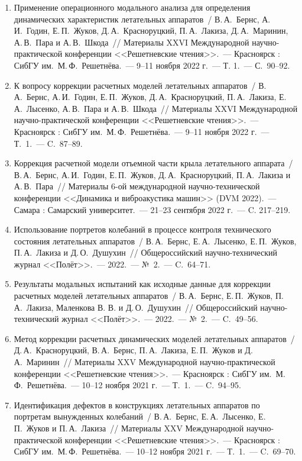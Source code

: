 \begin{enumerate}
	\item Применение операционного модального анализа для определения динамических характеристик летательных аппаратов~/ В.\,А.~Бернс, А.\,И.~Годин, Е.\,П.~Жуков, Д.\,А.~Красноруцкий, П.\,А.~Лакиза, Д.\,А.~Маринин, А.\,В.~Пара и А.\,В.~Шкода~// Материалы XXVI Международной научно-практической конференции <<Решетневские чтения>>.~--- Красноярск : СибГУ им.~М.\,Ф.~Решетнёва.~--- 9--11 ноября 2022 г.~--- Т. 1.~--- С.~90--92.
	\item К вопросу коррекции расчетных моделей летательных аппаратов~/ В.\,А.~Бернс, А.\,И.~Годин, Е.\,П.~Жуков, Д.\,А.~Красноруцкий, П.\,А.~Лакиза, Е.\,А.~Лысенко, А.\,В.~Пара и А.\,В.~Шкода~// Материалы XXVI Международной научно-практической конференции <<Решетневские чтения>>.~--- Красноярск : СибГУ им.~М.\,Ф.~Решетнёва.~--- 9--11 ноября 2022 г.~--- Т.~1.~--- C.~87--89.
	\item Коррекция расчетной модели отъемной части крыла летательного аппарата~/ В.\,А.~Бернс, А.\,И.~Годин, Е.\,П.~Жуков, Д.\,А.~Красноруцкий, П.\,А.~Лакиза и А.\,В.~Пара~// Материалы 6-ой международной научно-технической конференции <<Динамика и виброакустика машин>> (DVM 2022).~--- Самара : Самарский университет.~--- 21--23 сентября 2022 г.~--- C. 217--219.
	\item Использование портретов колебаний в процессе контроля технического состояния летательных аппаратов~/ В.\,А.~Бернс, Е.\,А.~Лысенко, Е.\,П.~Жуков, П.\,А.~Лакиза и Д.\,О.~Душухин~// Общероссийский научно-технический журнал <<Полёт>>.~--- 2022.~--- №~2.~--- C.~64--71.
	\item Результаты модальных испытаний как исходные данные для коррекции расчетных моделей летательных аппаратов~/ В.\,А.~Бернс, Е.\,П.~Жуков, П.\,А.~Лакиза, Маленкова В. В. и Д.\,О.~Душухин~// Общероссийский научно-технический журнал <<Полёт>>.~--- 2022.~--- №~2.~--- C.~49--56.
	\item Метод коррекции расчетных динамических моделей летательных аппаратов~/ Д.\,А.~Красноруцкий, В.\,А.~Бернс, П.\,А.~Лакиза, Е.\,П.~Жуков и Д.\,А.~Маринин~// Материалы XXV Международной научно-практической конференции <<Решетневские чтения>>.~--- Красноярск : СибГУ им.~М.\,Ф.~Решетнёва.~--- 10--12 ноября 2021 г.~--- Т.~1.~--- C.~94--95.
	\item Идентификация дефектов в конструкциях летательных аппаратов по портретам вынужденных колебаний~/ В.\,А.~Бернс, Е.\,А.~Лысенко, Е.\,П.~Жуков и П.\,А.~Лакиза~// Материалы XXV Международной научно-практической конференции <<Решетневские чтения>>.~--- Красноярск : СибГУ им.~М.\,Ф.~Решетнёва.~--- 10--12 ноября 2021 г.~--- Т.~1.~--- C.~69--70.

\end{enumerate}
